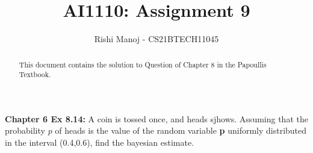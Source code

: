 \documentclass[journal,12pt,twocolumn]{IEEEtran}
\begin{document}
	
	
	\providecommand{\mbf}{\mathbf}
	\providecommand{\pr}[1]{\ensuremath{\Pr\left(#1\right)}}
	\providecommand{\qfunc}[1]{\ensuremath{Q\left(#1\right)}}
	\providecommand{\sbrak}[1]{\ensuremath{{}\left[#1\right]}}
	\providecommand{\lsbrak}[1]{\ensuremath{{}\left[#1\right.}}
	\providecommand{\rsbrak}[1]{\ensuremath{{}\left.#1\right]}}
	\providecommand{\brak}[1]{\ensuremath{\left(#1\right)}}
	\providecommand{\lbrak}[1]{\ensuremath{\left(#1\right.}}
	\providecommand{\rbrak}[1]{\ensuremath{\left.#1\right)}}
	\providecommand{\cbrak}[1]{\ensuremath{\left\{#1\right\}}}
	\providecommand{\lcbrak}[1]{\ensuremath{\left\{#1\right.}}
	\providecommand{\rcbrak}[1]{\ensuremath{\left.#1\right\}}}
	\providecommand{\dec}[2]{\ensuremath{\overset{#1}{\underset{#2}{\gtrless}}}}
	\newcommand{\myvec}[1]{\ensuremath{\begin{pmatrix}#1\end{pmatrix}}}
	\newcommand{\mydet}[1]{\ensuremath{\begin{vmatrix}#1\end{vmatrix}}}
	\newcommand*{\permcomb}[4][0mu]{{{}^{#3}\mkern#1#2_{#4}}}
	\newcommand*{\perm}[1][-3mu]{\permcomb[#1]{P}}
	\newcommand*{\comb}[1][-1mu]{\permcomb[#1]{C}}
		\title{
				AI1110: Assignment 9
		}
		\author{
			Rishi Manoj - CS21BTECH11045
		}
			
	\maketitle
	\begin{abstract}
		This document contains the solution to Question of Chapter 8 in the Papoullis Textbook.
	\end{abstract}
	
	\textbf{Chapter 6 Ex 8.14:}
	A coin is tossed once, and heads sjhows. Assuming that the probability $p$ of heads is the value of the random variable \textbf{p} uniformly distributed in the interval (0.4,0.6), find the bayesian estimate.
	
\end{document}
